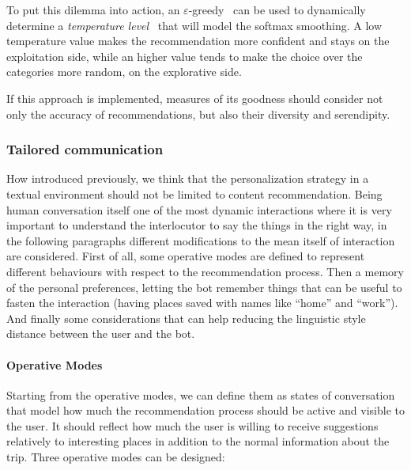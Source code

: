 To put this dilemma into action, an $\varepsilon$-greedy~\cite{tokic2010adaptive} can be used to dynamically determine a \textit{temperature level}~\cite{hinton2015distilling} that will model the softmax smoothing. A low temperature value makes the recommendation more confident and stays on the exploitation side, while an higher value tends to make the choice over the categories more random, on the explorative side.

If this approach is implemented, measures of its goodness should consider not only the accuracy of recommendations, but also their diversity and serendipity.

\subsubsection{Tailored communication}
\label{approachPersonalizationCommunication}

How introduced previously, we think that the personalization strategy in a textual environment should not be limited to content recommendation. Being human conversation itself one of the most dynamic interactions where it is very important to understand the interlocutor to say the things in the right way, in the following paragraphs different modifications to the mean itself of interaction are considered. First of all, some operative modes are defined to represent different behaviours with respect to the recommendation process. Then a memory of the personal preferences, letting the bot remember things that can be useful to fasten the interaction (having places saved with names like ``home'' and ``work''). And finally some considerations that can help reducing the linguistic style distance between the user and the bot.

\paragraph{Operative Modes}
Starting from the operative modes, we can define them as states of conversation that model how much the recommendation process should be active and visible to the user. It should reflect how much the user is willing to receive suggestions relatively to interesting places in addition to the normal information about the trip.
Three operative modes can be designed:

